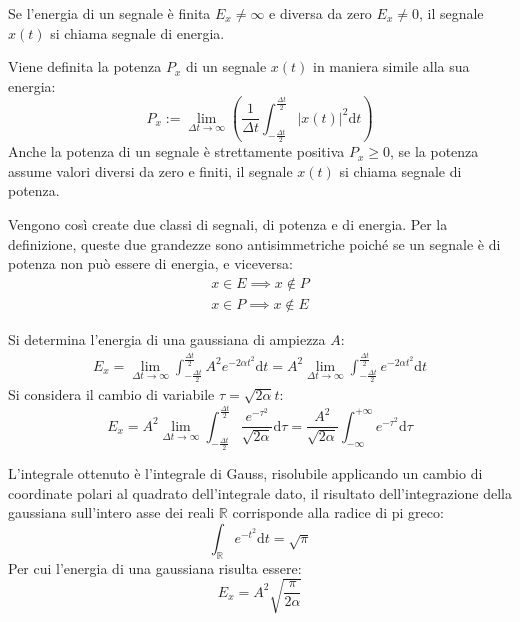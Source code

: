 \documentclass{article}
\newcommand{\df}{\mathrm{d}}
\numberwithin{equation}{subsection}
\begin{document}
Se l'energia di un segnale è finita $E_x\neq\infty$ e diversa da zero $E_x\neq0$, il segnale $x(t)$ si chiama segnale di energia.


Viene definita la potenza $P_x$ di un segnale $x(t)$ in maniera simile alla sua energia:
\begin{equation}
    P_x:=\lim_{\Delta t\to\infty}\displaystyle\left(\frac{1}{\Delta t}\int_{-\frac{\Delta t}{2}}^{\frac{\Delta t}{2}}|x(t)|^2\df t\right)
\end{equation}
Anche la potenza di un segnale è strettamente positiva $P_x\geq0$, se la potenza assume valori diversi da zero e finiti, il segnale $x(t)$ si chiama segnale di potenza. 

Vengono così create due classi di segnali, di potenza e di energia. Per la definizione, queste due grandezze sono antisimmetriche poiché se un segnale è di potenza non può 
essere di energia, e viceversa: 
\begin{gather*}
    x\in E\implies x\notin P\\
    x\in P\implies x\notin E
\end{gather*}

Si determina l'energia di una gaussiana di ampiezza $A$:
\begin{gather*}
    E_x=\lim_{\Delta t\to\infty}\displaystyle\int_{-\frac{\Delta t}{2}}^{\frac{\Delta t}{2}}A^2e^{-2\alpha t^2}\df t=A^2\lim_{\Delta t\to\infty}\displaystyle\int_{-\frac{\Delta t}{2}}^{\frac{\Delta t}{2}}e^{-2\alpha t^2}\df t
\end{gather*}
Si considera il cambio di variabile $\tau=\sqrt{2\alpha}t$:
\begin{equation*}
    E_x=A^2\lim_{\Delta t\to\infty}\displaystyle\int_{-\frac{\Delta t}{2}}^{\frac{\Delta t}{2}}\frac{e^{-\tau^2}}{\sqrt{2\alpha}}\df\tau=\frac{A^2}{\sqrt{2\alpha}}\int_{-\infty}^{+\infty}e^{-\tau^2}\df\tau
\end{equation*}

L'integrale ottenuto è l'integrale di Gauss, risolubile applicando un cambio di coordinate polari al quadrato dell'integrale dato, il risultato dell'integrazione della 
gaussiana sull'intero asse dei reali $\mathbb{R}$ corrisponde alla radice di pi greco: 
\begin{equation*}
    \displaystyle\int_{\mathbb{R}}e^{-t^2}\df t=\sqrt\pi
\end{equation*}
Per cui l'energia di una gaussiana risulta essere:
\begin{equation}
    E_x=A^2\displaystyle\sqrt{\frac{\pi}{2\alpha}}
\end{equation}
\end{document}
